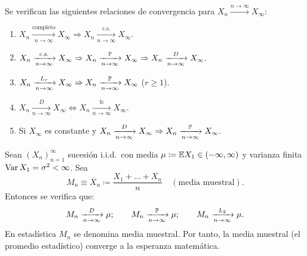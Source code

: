 \begin{teorema}[11]
Se verifican las siguientes relaciones de convergencia para $X_n \xrightarrow{n\to\infty} X_\infty$:
\begin{enumerate}
  \item $X_n \xrightarrow[n\to\infty]{\text{completo}} X_\infty \Rightarrow X_n \xrightarrow[n\to\infty]{\text{c.s.}} X_\infty$.
  \item $X_n \xrightarrow[n\to\infty]{\text{c.s.}} X_\infty \Rightarrow X_n \xrightarrow[n\to\infty]{\mathbb{P}} X_\infty \Rightarrow X_n \xrightarrow[n\to\infty]{D} X_\infty$.
  \item $X_n \xrightarrow[n\to\infty]{L_r} X_\infty \Rightarrow X_n \xrightarrow[n\to\infty]{\mathbb{P}} X_\infty$ ($r \ge 1$).
  \item $X_n \xrightarrow[n\to\infty]{D} X_\infty \iff X_n \xrightarrow[n\to\infty]{\text{fc}} X_\infty$.
  \item Si $X_\infty$ es constante y $X_n \xrightarrow[n\to\infty]{D} X_\infty \Rightarrow X_n \xrightarrow[n\to\infty]{\mathbb{P}} X_\infty$.
\end{enumerate}
\end{teorema}

\begin{teorema}
Sean $(X_n)_{n=1}^\infty$ sucesión i.i.d.\ con media $\mu \coloneqq \mathbb{E} X_1 \in (-\infty, \infty)$ y varianza finita $\operatorname{Var} X_1 = \sigma^2 < \infty$. Sea
\[
  M_n \equiv \overline{X}_n \coloneqq \frac{X_1 + \dots + X_n}{n} \quad (\text{media muestral}).
\]
Entonces se verifica que:
\[
  M_n \xrightarrow[n\to\infty]{D} \mu; \qquad M_n \xrightarrow[n\to\infty]{\mathbb{P}} \mu; \qquad M_n \xrightarrow[n\to\infty]{L_2} \mu.
\]
En estadística $M_n$ se denomina media muestral. Por tanto, la media muestral (el promedio estadístico) converge a la esperanza matemática.
\end{teorema}

